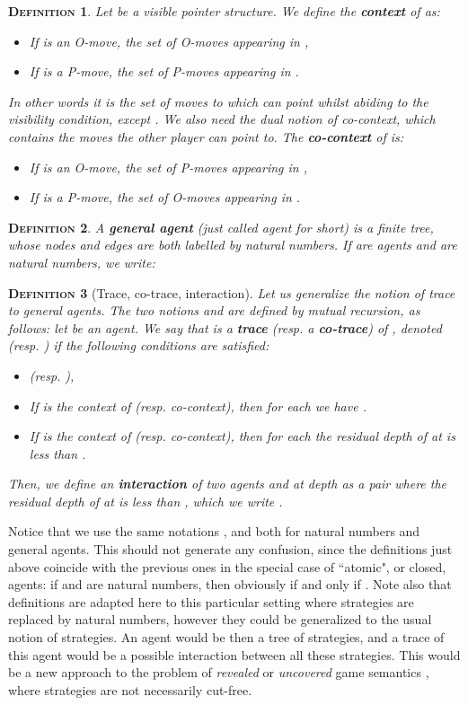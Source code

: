 \documentclass{article}
\newtheorem{definition}{\textsc{Definition}}
\begin{document}
\begin{definition}
Let  be a visible pointer structure. We define the \textbf{context} of  as:
\begin{itemize}
\item If  is an O-move, the set  of O-moves appearing in ,
\item If  is a P-move, the set  of P-moves appearing in .
\end{itemize}
In other words it is the set of moves to which  can point whilst abiding to the visibility condition, except . We also need the dual notion
of co-context, which contains the moves the other player can point to. The \textbf{co-context} of  is:
\begin{itemize}
\item If  is an O-move, the set  of P-moves appearing in ,
\item If  is a P-move, the set  of O-moves appearing in .
\end{itemize}
\end{definition}

\begin{definition}
A \textbf{general agent} (just called agent for short) is a finite tree, whose nodes and edges are both labelled by natural numbers. If  are agents and  are natural numbers, we write:

\end{definition}

\begin{definition}[Trace, co-trace, interaction]
Let us generalize the notion of trace to general agents. The two notions  and  are defined by mutual recursion, as follows:
let  be an agent. We say that  is a \textbf{trace} (resp. a \textbf{co-trace}) of , denoted  (resp.
) if the following conditions are satisfied:
\begin{itemize}
\item  (resp. ),
\item If  is the context of  (resp. co-context), then for each  we have .
\item If  is the context of  (resp. co-context), then for each  the residual depth of  at  is less than .
\end{itemize}
Then, we define an \textbf{interaction} of two agents  and  at depth  as a pair  where the residual depth of  at  is less than , which we write .
\end{definition}
Notice that we use the same notations ,  and  both for natural numbers and general agents. This should not generate any confusion, since the definitions
just above coincide with the previous ones in the special case of ``atomic", or closed, agents: if  and  are natural numbers, then obviously  if and
only if .
Note also that definitions are adapted here to this particular setting where strategies are replaced by natural numbers, however they could be generalized to the usual notion
of strategies. An agent would be then a tree of strategies, and a trace of this agent would be a possible interaction between all these strategies. This would
be a new approach to the problem of \emph{revealed} or \emph{uncovered} game semantics \cite{greenland2004game,blum2008thesis}, where strategies are not necessarily cut-free.
\end{document}
